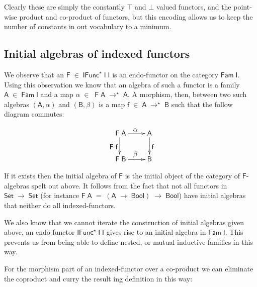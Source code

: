 \documentclass[a4paper]{article}
\newcommand{\Conid}[1]{\mathit{#1}}
\newcommand{\Varid}[1]{\mathit{#1}}
\renewcommand\Varid[1]{\mathord{\textsf{#1}}}
\let\Conid\Varid
\begin{document}
\noindent
Clearly these are simply the constantly \ensuremath{\top} and \ensuremath{\bot} valued functors, and the 
point-wise product and co-product of functors, but this encoding allows us to 
keep the number of constants in out vocabulary to a minimum.

\subsection{Initial algebras of indexed functors}

We observe that an \ensuremath{\Conid{F}\;\in\;\Conid{IFunc}^{\star}\;\Conid{I}\;\Conid{I}} is an endo-functor on the category \ensuremath{\Conid{Fam}\;\Conid{I}}. 
Using this observation we know that an algebra of such a functor is a family 
\ensuremath{\Conid{A}\;\in\;\Conid{Fam}\;\Conid{I}} and a map \ensuremath{\alpha\;\in\;\;\Conid{F}\;\Conid{A}\;\rightarrow^{\star}\;\Conid{A}}. A morphism, then, between two such 
algebras \ensuremath{(\Conid{A},\alpha)} and \ensuremath{(\Conid{B},\beta)} is a map \ensuremath{\Varid{f}\;\in\;\Conid{A}\;\rightarrow^{\star}\;\Conid{B}} such that the follow 
diagram commutes:

 \[
\xymatrix{
\mbox{\ensuremath{\;\Conid{F}\;\Conid{A}}}  \ar[r]^{\;\mbox{\ensuremath{\alpha}}} 
\ar[d]_{\mbox{\ensuremath{\;\Conid{F}\;\Varid{f}}}} & \mbox{\ensuremath{\Conid{A}}} \ar[d]^{\mbox{\ensuremath{\Varid{f}}}}\\
\mbox{\ensuremath{\;\Conid{F}\;\Conid{B}}} \ar[r]^{\;\mbox{\ensuremath{\beta}}} & \mbox{\ensuremath{\Conid{B}}}}
\]

\noindent
If it exists then the initial algebra of \ensuremath{\Conid{F}} is the initial object of the 
category of \ensuremath{\Conid{F}}-algebras spelt out above. It follows from the fact that not all
functors in \ensuremath{\Conid{Set}\;\rightarrow\;\Conid{Set}} (for instance \ensuremath{\Conid{F}\;\Conid{A}\;\mathrel{=}\;(\Conid{A}\;\rightarrow\;\Conid{Bool})\;\rightarrow\;\Conid{Bool}}) have initial 
algebras that neither do all indexed-functors.

We also know that we cannot iterate the construction of initial algebras given 
above, an endo-functor \ensuremath{\Conid{IFunc}^{\star}\;\Conid{I}\;\Conid{I}} gives rise to an initial algebra in \ensuremath{\Conid{Fam}\;\Conid{I}}.
This prevents us from being able to define nested, or mutual inductive families 
in this way.

For the morphism part of an indexed-functor over a co-product we can eliminate
the coproduct and curry the result ing definition in this way:
\end{document}
